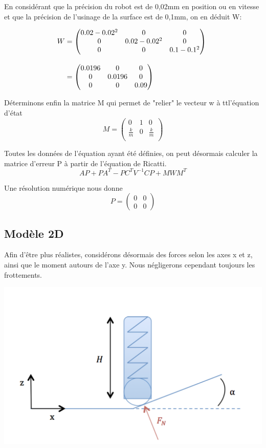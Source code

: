 \documentclass[12pt,twoside,a4paper]{article}
\begin{document}
En considérant que la précision du robot est de 0,02mm en position ou en vitesse et que la précision de l'usinage de la surface est de 0,1mm, on en déduit W:

\begin{align*}
W &=
\begin{pmatrix}
0.02-0.02^2 & 0 & 0  \\
0 & 0.02-0.02^2  & 0  \\
 0 & 0 & 0.1-0.1^2  \\
\end{pmatrix} \\
&=
\begin{pmatrix}
0.0196 & 0 & 0  \\
0 & 0.0196 & 0  \\
0 & 0 & 0.09  \\
\end{pmatrix} \rule[20pt]{0pt}{10pt} 
\end{align*}


Déterminons enfin la matrice M qui permet de "relier" le vecteur w à ttl'équation d'état 
$$
M = 
\begin{pmatrix}
0 & 1 & 0 \\
\frac{k}{m} & 0 & \frac{k}{m}  \\
\end{pmatrix}
$$


Toutes les données de l'équation ayant été définies, on peut désormais calculer la matrice d'erreur P à partir de l'équation de Ricatti. 
$$ AP + PA^T -PC^T V^{-1} CP + MWM^{T} $$

Une résolution numérique nous donne 
$$
P = \begin{pmatrix} 0 & 0 \\
	0 & 0 
	\end{pmatrix} 
$$


\subsection{Modèle 2D}

Afin d'être plus réalistes, considérons désormais des forces selon les axes x et z, ainsi que le moment autours de l'axe y. Nous négligerons cependant toujours les frottements. \\

\begin{center}
\includegraphics[scale=0.5]{schema_Kalman.png}
\end{center}
\end{document}
